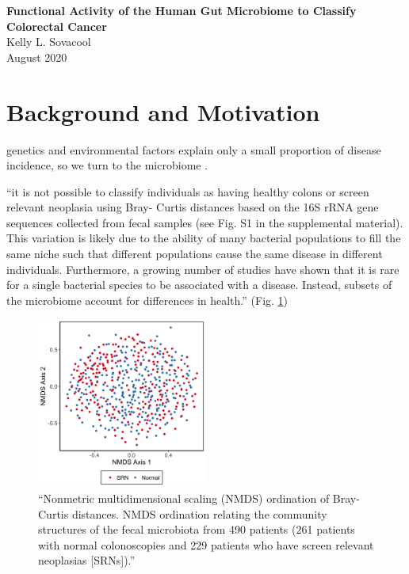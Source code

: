 \documentclass[11pt]{article}
\begin{document}
\sloppy
\begin{center}
\large{\textbf{
    Functional Activity of the Human Gut Microbiome to Classify Colorectal Cancer
}} \\
\vspace{11pt}
\small{
    Kelly L. Sovacool \\
    August 2020
}
\end{center}



\section*{Background and Motivation} %

genetics and environmental factors explain only a small proportion of disease incidence, so we turn to the microbiome \cite{thomas_metagenomic_2019}.

``it is not possible to classify individuals as having healthy colons or screen relevant neoplasia using Bray- Curtis distances based on the 16S rRNA gene sequences collected from fecal samples (see Fig. S1 in the supplemental material). This variation is likely due to the ability of many bacterial populations to fill the same niche such that different populations cause the same disease in different individuals. Furthermore, a growing number of studies have shown that it is rare for a single bacterial species to be associated with a disease. Instead, subsets of the microbiome account for differences in health.'' \cite{topcuoglu_framework_2020} (Fig. \ref{fig:nmds_otu})

\begin{figure}
    \begin{center}
        \includegraphics[width=0.5\textwidth]{figures/topcuoglu_s1.png}
        \caption{``Nonmetric multidimensional scaling (NMDS) ordination of Bray-Curtis distances. NMDS ordination relating the community structures of the fecal microbiota from 490 patients (261 patients with normal colonoscopies and 229 patients who have screen relevant neoplasias [SRNs]).'' \cite{topcuoglu_framework_2020}}
        \label{fig:nmds_otu}
    \end{center}
\end{figure}
\end{document}
